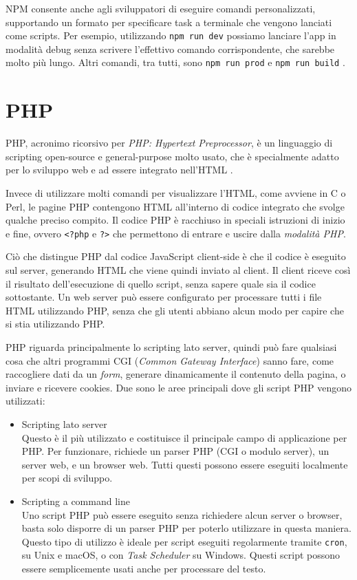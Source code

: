 NPM consente anche agli sviluppatori di eseguire comandi personalizzati, supportando un formato per specificare task a terminale che vengono lanciati come scripts. Per esempio, utilizzando \Verb_npm run dev_ possiamo lanciare l'app in modalità debug senza scrivere l'effettivo comando corrispondente, che sarebbe molto più lungo. Altri comandi, tra tutti, sono \Verb_npm run prod_ e \Verb_npm run build_ \cite{NPM_Package_Manager}.

\section{PHP}
PHP, acronimo ricorsivo per \textit{PHP: Hypertext Preprocessor}, è un linguaggio di scripting open-source e general-purpose molto usato, che è specialmente adatto per lo sviluppo web e ad essere integrato nell'HTML \cite{PHP, PHP_Docs}.

Invece di utilizzare molti comandi per visualizzare l'HTML, come avviene in C o Perl, le pagine PHP contengono HTML all'interno di codice integrato che svolge qualche preciso compito. Il codice PHP è racchiuso in speciali istruzioni di inizio e fine, ovvero \Verb_<?php_ e \Verb_?>_ che permettono di entrare e uscire dalla \textit{modalità PHP}.

Ciò che distingue PHP dal codice JavaScript client-side è che il codice è eseguito sul server, generando HTML che viene quindi inviato al client. Il client riceve così il risultato dell'esecuzione di quello script, senza sapere quale sia il codice sottostante. Un web server può essere configurato per processare tutti i file HTML utilizzando PHP, senza che gli utenti abbiano alcun modo per capire che si stia utilizzando PHP.

PHP riguarda principalmente lo scripting lato server, quindi può fare qualsiasi cosa che altri programmi CGI (\textit{Common Gateway Interface}) sanno fare, come raccogliere dati da un \textit{form}, generare dinamicamente il contenuto della pagina, o inviare e ricevere cookies. Due sono le aree principali dove gli script PHP vengono utilizzati:
\begin{itemize}
    \item Scripting lato server\\
    Questo è il più utilizzato e costituisce il principale campo di applicazione per PHP. Per funzionare, richiede un parser PHP (CGI o modulo server), un server web, e un browser web. Tutti questi possono essere eseguiti localmente per scopi di sviluppo.
    \item Scripting a command line\\
    Uno script PHP può essere eseguito senza richiedere alcun server o browser, basta solo disporre di un parser PHP per poterlo utilizzare in questa maniera. Questo tipo di utilizzo è ideale per script eseguiti regolarmente tramite \Verb_cron_, su Unix e macOS, o con \textit{Task Scheduler} su Windows. Questi script possono essere semplicemente usati anche per processare del testo.
\end{itemize}

